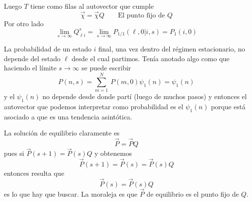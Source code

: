 \documentclass[10pt,oneside]{CBFT_book}
\begin{document}
Luego $T$ tiene como filas al autovector que cumple
\[
	\vec{\chi} = \vec{\chi} Q \qquad \text{El punto fijo de $Q$}
\]
Por otro lado
\[
	\lim_{s\to \infty} Q^s_{\ell i} = \lim_{s\to \infty} P_{1/1}(\ell, 0 | i,s) = P_1(i,0)
\]

La probabilidad de un estado $i$ final, una vez dentro del régimen estacionario, no depende del estado
$\ell$ desde el cual partimos.
Tenía anotado algo como que haciendo el límite $s \to \infty$ se puede escribir
\[
	P(n,s) = \sum_{m=1}^N \: P(m,0) \psi_1(n) = \psi_1(n)
\]
y el $\psi_1(n)$ no depende desde donde partí (luego de muchos pasos) y entonces el autovector que
podemos interpretar como probabilidad es el $\psi_1(n)$ porque está asociado a que es una
tendencia asintótica.

La solución de equilibrio claramente es
\[
	\vec{P} = \vec{P} Q 
\]
pues si $\vec{P}(s+1) = \vec{P}(s)Q$ y obtenemos
\[
	\vec{P}(s+1) = \vec{P}(s) = \vec{P}(s)Q
\]
entonces resulta que 
\[
	\vec{P}(s)  = \vec{P}(s) Q
\]
es lo que hay que buscar.
La moraleja es que $\vec{P}$ de equilibrio es el punto fijo de $Q$.

\end{document}
